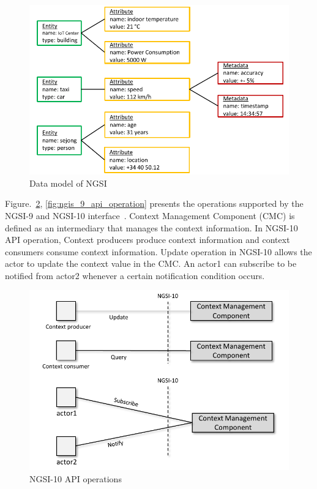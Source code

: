 \begin{figure}[H]			%
	\centering
	\includegraphics[width=\textwidth]{figures/fig_ngsi_example.pdf}
    \caption{Data model of NGSI}
    \label{fig:ngsi_datamodel}
\end{figure}

Figure.~\ref{fig:ngis_10_api_operation}, \ref{fig:ngis_9_api_operation} presents the operations supported by the NGSI-9 and NGSI-10 interface~\cite{bauer2017wise_iot_d1.3}. Context Management Component (CMC) is defined as an intermediary that manages the context information. In NGSI-10 API operation, Context producers produce context information and context consumers consume context information. Update operation in NGSI-10 allows the actor to update the context value in the CMC. An actor1 can subscribe to be notified from actor2 whenever a certain notification condition occurs.

\begin{figure}[H]			%
	\centering
	\includegraphics[width=\textwidth]{figures/fig_NGSI_10_api.pdf}
    \caption{NGSI-10 API operations}
    \label{fig:ngis_10_api_operation}
\end{figure}

